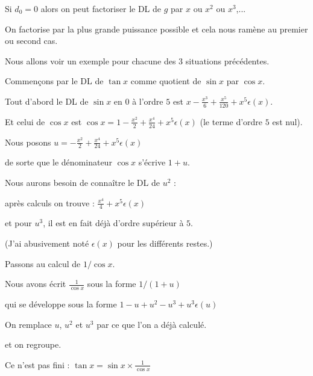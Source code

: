 \change 

Si $d_0=0$ alors on peut factoriser le DL de $g$ par $x$ ou $x^2$ ou $x^3$,...

On factorise par la plus grande puissance possible
et cela nous ramène au premier ou second cas.



\diapo

Nous allons voir un exemple pour chacune des $3$ situations précédentes.

Commençons par le DL de $\tan x$ comme quotient de $\sin x$ par $\cos x$.

\change

Tout d'abord le DL de $\sin x$ en $0$ à l'ordre $5$ est $x-\frac{x^3}{6}+\frac{x^5}{120}+x^5\epsilon(x)$.

\change

Et celui de $\cos x$ est  $\cos  x=1-\frac{x^2}{2}+\frac{x^4}{24} +x^5\epsilon(x)$
(le terme d'ordre $5$ est nul).

\change

Nous posons $u= -\frac{x^2}{2}+\frac{x^4}{24} +x^5\epsilon(x)$

de sorte que le dénominateur $\cos x$ s'écrive $1+u$.

\change

Nous aurons besoin de connaître le DL de $u^2$ :

\change

après calculs on trouve :
$ \frac{x^4}{4}+x^5\epsilon(x)$

\change

et pour $u^3$, il est en fait déjà d'ordre supérieur à $5$.

(J'ai abusivement noté $\epsilon(x)$ pour les différents restes.)


\change

Passons au calcul de $1/\cos x$.

Nous avons écrit $\frac{1}{\cos x}$ sous la forme $1/(1+u)$

\change

qui se développe sous la forme 
 $1-u+u^2-u^3+u^3\epsilon(u)$

\change

On remplace $u$, $u^2$ et $u^3$ par ce que l'on a déjà calculé.

\change

et on regroupe.

\change


Ce n'est pas fini :
$\tan x= \sin x \times \frac1{\cos x} $

